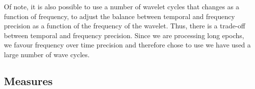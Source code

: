 \documentclass[11pt, onecolumn]{article}
\begin{document}
Of note, it is also possible to use a number of wavelet cycles that changes as a function of frequency, to adjust the balance between temporal and frequency precision as a function of the frequency of the wavelet. Thus, there is a trade-off between temporal and frequency precision. Since we are processing long epochs, we favour frequency over time precision and therefore chose to use we have used a large number  of wave cycles.

\subsection{Measures}
\end{document}
